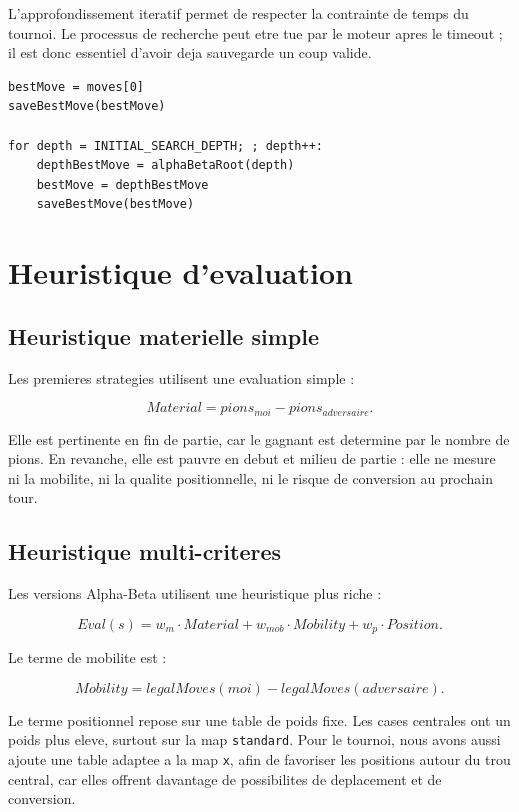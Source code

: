 \documentclass[12pt,a4paper]{article}
\begin{document}
    L'approfondissement iteratif permet de respecter la contrainte de temps du tournoi. Le processus de
    recherche peut etre tue par le moteur apres le timeout ; il est donc essentiel d'avoir deja sauvegarde
    un coup valide.

    \begin{lstlisting}
bestMove = moves[0]
saveBestMove(bestMove)

for depth = INITIAL_SEARCH_DEPTH; ; depth++:
    depthBestMove = alphaBetaRoot(depth)
    bestMove = depthBestMove
    saveBestMove(bestMove)
    \end{lstlisting}


    \section{Heuristique d'evaluation}

    \subsection{Heuristique materielle simple}

    Les premieres strategies utilisent une evaluation simple :

    \[
        Material = pions_{moi} - pions_{adversaire}.
    \]

    Elle est pertinente en fin de partie, car le gagnant est determine par le nombre de pions. En revanche,
    elle est pauvre en debut et milieu de partie : elle ne mesure ni la mobilite, ni la qualite positionnelle,
    ni le risque de conversion au prochain tour.

    \subsection{Heuristique multi-criteres}

    Les versions Alpha-Beta utilisent une heuristique plus riche :

    \[
        Eval(s) =
        w_m \cdot Material
        + w_{mob} \cdot Mobility
        + w_p \cdot Position.
    \]

    Le terme de mobilite est :

    \[
        Mobility = legalMoves(moi) - legalMoves(adversaire).
    \]

    Le terme positionnel repose sur une table de poids fixe. Les cases centrales ont un poids plus eleve, surtout sur la map \texttt{standard}. Pour le tournoi,
    nous avons aussi ajoute une table adaptee a la map \texttt{x}, afin de favoriser les positions autour du trou central,
    car elles offrent davantage de possibilites de deplacement et de conversion.
\end{document}
